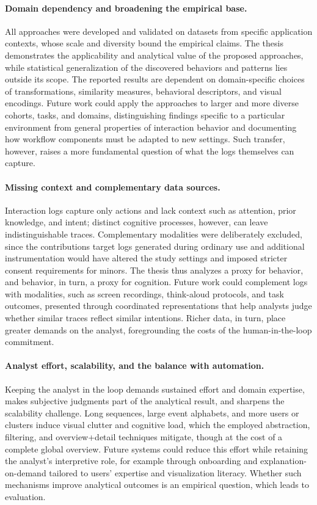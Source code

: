 \paragraph{Domain dependency and broadening the empirical base.}
All approaches were developed and validated on datasets from specific application contexts, whose scale and diversity bound the empirical claims.
The thesis demonstrates the applicability and analytical value of the proposed approaches, while statistical generalization of the discovered behaviors and patterns lies outside its scope.
The reported results are dependent on domain-specific choices of transformations, similarity measures, behavioral descriptors, and visual encodings.
Future work could apply the approaches to larger and more diverse cohorts, tasks, and domains, distinguishing findings specific to a particular environment from general properties of interaction behavior and documenting how workflow components must be adapted to new settings.
Such transfer, however, raises a more fundamental question of what the logs themselves can capture.


\paragraph{Missing context and complementary data sources.}
Interaction logs capture only actions and lack context such as attention, prior knowledge, and intent; distinct cognitive processes, however, can leave indistinguishable traces.
Complementary modalities were deliberately excluded, since the contributions target logs generated during ordinary use and additional instrumentation would have altered the study settings and imposed stricter consent requirements for minors.
The thesis thus analyzes a proxy for behavior, and behavior, in turn, a proxy for cognition.
Future work could complement logs with modalities, such as screen recordings, think-aloud protocols, and task outcomes, presented through coordinated representations that help analysts judge whether similar traces reflect similar intentions.
Richer data, in turn, place greater demands on the analyst, foregrounding the costs of the human-in-the-loop commitment.


\paragraph{Analyst effort, scalability, and the balance with automation.}
Keeping the analyst in the loop demands sustained effort and domain expertise, makes subjective judgments part of the analytical result, and sharpens the scalability challenge.
Long sequences, large event alphabets, and more users or clusters induce visual clutter and cognitive load, which the employed abstraction, filtering, and overview+detail techniques mitigate, though at the cost of a complete global overview.
Future systems could reduce this effort while retaining the analyst's interpretive role, for example through onboarding and explanation-on-demand tailored to users' expertise and visualization literacy.
Whether such mechanisms improve analytical outcomes is an empirical question, which leads to evaluation.


